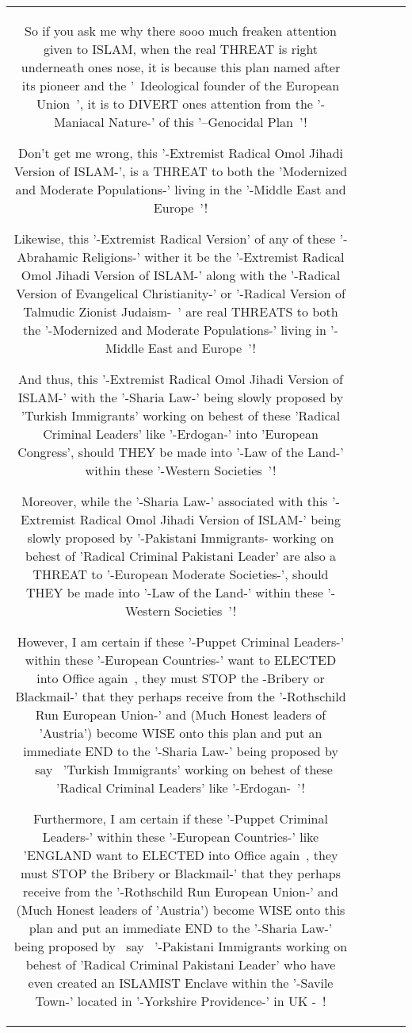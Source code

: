\documentclass[11pt]{article}
\newlength\mylength
\begin{document}
\begin{center}
\begin{longtable}{|C{.65\mylength}|C{.30\mylength}|C{.12\mylength}|C{.12\mylength}|C{.12\mylength}|}
  \small So if you ask me why there sooo much freaken attention given to ISLAM, when the real THREAT is right underneath 
ones nose, it is because this plan named after its pioneer and the '~Ideological founder of the European Union~', it is to DIVERT ones attention from the '-Maniacal Nature-' of this '--Genocidal Plan~'!

Don't get me wrong, this '-Extremist Radical Omol Jihadi Version of ISLAM-', is a THREAT to both the 'Modernized and Moderate Populations-' living in the '-Middle East and Europe~'!

Likewise, this '-Extremist Radical Version' of any of these '-Abrahamic Religions-' wither it be the '-Extremist Radical Omol Jihadi Version of ISLAM-' along with the '-Radical Version of Evangelical Christianity-' or '-Radical Version of Talmudic Zionist Judaism-~' are real THREATS to both the '-Modernized and Moderate Populations-' living in '-Middle East and Europe~'!

And thus, this '-Extremist Radical Omol Jihadi Version of ISLAM-' with the '-Sharia Law-' being slowly proposed by 'Turkish Immigrants' working on behest of these 'Radical Criminal Leaders' like '-Erdogan-' into 'European Congress', should THEY be made into '-Law of the Land-' within these '-Western Societies~'!

Moreover, while the '-Sharia Law-' associated with  this '-Extremist Radical Omol Jihadi Version of ISLAM-' being slowly proposed by '-Pakistani Immigrants- working on behest of  'Radical Criminal Pakistani Leader' are also a THREAT to '-European Moderate Societies-', should THEY be made into '-Law of the Land-' within these '-Western Societies~'!

However, I am certain if these '-Puppet Criminal Leaders-' within these '-European Countries-' want to ELECTED into Office again~, they must STOP the -Bribery or Blackmail-' that they perhaps receive from the '-Rothschild Run European Union-' and (Much Honest leaders of 'Austria') become WISE onto this plan and put an immediate END to the '-Sharia Law-' being proposed by ~say~ 'Turkish Immigrants' working on behest of these 'Radical Criminal Leaders' like '-Erdogan-~'!

Furthermore,  I am certain if these '-Puppet Criminal Leaders-' within these '-European Countries-' like 'ENGLAND want to ELECTED into Office again~, they must STOP the Bribery or Blackmail-' that they perhaps receive from the '-Rothschild Run European Union-' and (Much Honest leaders of 'Austria') become WISE onto this plan and put an immediate END to the '-Sharia Law-' being proposed by ~say~  '-Pakistani Immigrants working on behest of 'Radical Criminal Pakistani Leader' who have even created an ISLAMIST Enclave within the '-Savile Town-' located in '-Yorkshire Providence-' in UK -~!


\end{longtable}
\end{center}
\end{document}
